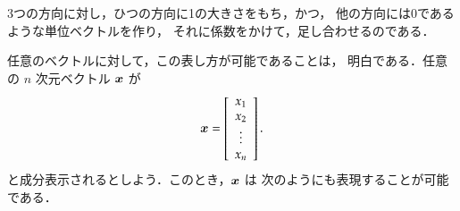                3つの方向に対し，ひつの方向に1の大きさをもち，かつ，
                他の方向には0であるような単位ベクトルを作り，
                それに係数をかけて，足し合わせるのである．

                任意のベクトルに対して，この表し方が可能であることは，
                明白である．任意の $n$ 次元ベクトル $\boldsymbol{x}$ が
                    \begin{equation*}
                        \boldsymbol{x}
                        =
                        \left[
                            \begin{array}{c}
                                x_{1} \\
                                x_{2} \\
                                \vdots \\
                                x_{n} \\
                            \end{array}
                        \right].
                    \end{equation*}
                と成分表示されるとしよう．このとき，$\boldsymbol{x}$ は
                次のようにも表現することが可能である．
